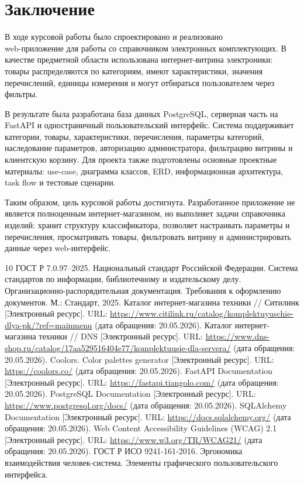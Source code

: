 \documentclass[a4paper,14pt]{extarticle}
\begin{document}
\section*{Заключение}

В ходе курсовой работы было спроектировано и реализовано \\ web-приложение для работы со справочником электронных комплектующих. В качестве предметной области использована интернет-витрина электроники: товары распределяются по категориям, имеют характеристики, значения перечислений, единицы измерения и могут отбираться пользователем через фильтры.

В результате была разработана база данных PostgreSQL, серверная часть на FastAPI и одностраничный пользовательский интерфейс. Система поддерживает категории, товары, характеристики, перечисления, параметры категорий, наследование параметров, авторизацию администратора, фильтрацию витрины и клиентскую корзину. Для проекта также подготовлены основные проектные материалы: use-case, диаграмма классов, ERD, информационная архитектура, task flow и тестовые сценарии.

Таким образом, цель курсовой работы достигнута. Разработанное приложение не является полноценным интернет-магазином, но выполняет задачи справочника изделий: хранит структуру классификатора, позволяет настраивать параметры и перечисления, просматривать товары, фильтровать витрину и администрировать данные через web-интерфейс.

\newpage
\begin{thebibliography}{10}
 ГОСТ Р 7.0.97--2025. Национальный стандарт Российской Федерации. Система стандартов по информации, библиотечному и издательскому делу. Организационно-распорядительная документация. Требования к оформлению документов. М.: Стандарт, 2025.
 Каталог интернет-магазина техники // Ситилинк [Электронный ресурс]. URL: \url{https://www.citilink.ru/catalog/komplektuyuschie-dlya-pk/?ref=mainmenu} (дата обращения: 20.05.2026).
 Каталог интернет-магазина техники // DNS [Электронный ресурс]. URL: \url{https://www.dns-shop.ru/catalog/17aa529516404e77/komplektuusie-dla-servera/} (дата обращения: 20.05.2026).
 Coolors. Color palettes generator [Электронный ресурс]. URL: \url{https://coolors.co/} (дата обращения: 20.05.2026).
 FastAPI Documentation [Электронный ресурс]. URL: \url{https://fastapi.tiangolo.com/} (дата обращения: 20.05.2026).
 PostgreSQL Documentation [Электронный ресурс]. URL: \url{https://www.postgresql.org/docs/} (дата обращения: 20.05.2026).
 SQLAlchemy Documentation [Электронный ресурс]. URL: \url{https://docs.sqlalchemy.org/} (дата обращения: 20.05.2026).
 Web Content Accessibility Guidelines (WCAG) 2.1 [Электронный ресурс]. URL: \url{https://www.w3.org/TR/WCAG21/} (дата обращения: 20.05.2026).
 ГОСТ Р ИСО 9241-161-2016. Эргономика взаимодействия человек-система. Элементы графического пользовательского интерфейса.
\end{thebibliography}
\end{document}
